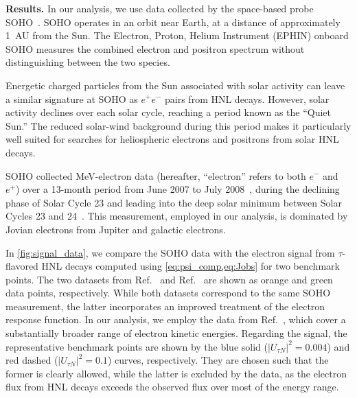 \documentclass[aps,prd,twocolumn,preprintnumbers,superscriptaddress,nofootinbib]{revtex4-1}
\begin{document}
\textbf{Results.}
\noindent
In our analysis, we use data collected by the space-based probe SOHO~\cite{SOHO1995S}. SOHO operates in an orbit near Earth, at a distance of approximately 1~AU from the Sun. The Electron, Proton, Helium Instrument (EPHIN) \cite{COSTEP} onboard SOHO measures the combined electron and positron spectrum without distinguishing between the two species.


Energetic charged particles from the Sun associated with solar activity can leave a similar signature at SOHO as $e^+e^-$ pairs from HNL decays. However, solar activity declines over each solar cycle, reaching a period known as the ``Quiet Sun.'' The reduced solar-wind background during this period makes it particularly well suited for searches for heliospheric electrons and positrons from solar HNL decays.

SOHO collected MeV-electron data (hereafter, ``electron'' refers to both $e^-$ and $e^+$) over a 13-month period from June 2007 to July 2008~\cite{Kuhl:2013icrc,Jensen2026SOHO}, during the declining phase of Solar Cycle 23 and leading into the deep solar minimum between Solar Cycles 23 and 24~\cite{NOAA:solarcycle}. This measurement, employed in our analysis, is dominated by Jovian electrons from Jupiter and galactic electrons.

In \cref{fig:signal_data}, we compare the SOHO data with the electron signal from $\tau$-flavored HNL decays computed using \cref{eq:psi_comp,eq:Jobs} for two benchmark points. The two datasets from Ref.~\cite{Kuhl:2013icrc} and Ref.~\cite{Jensen2026SOHO} are shown as orange and green data points, respectively. While both datasets correspond to the same SOHO measurement, the latter incorporates an improved treatment of the electron response function. In our analysis, we employ the data from Ref.~\cite{Kuhl:2013icrc}, which cover a substantially broader range of electron kinetic energies. Regarding the signal, the representative benchmark points are shown by the blue solid ($|U_{\tau N}|^2=0.004$) and red dashed ($|U_{\tau N}|^2=0.1$) curves, respectively. They are chosen such that the former is clearly allowed, while the latter is excluded by the data, as the electron flux from HNL decays exceeds the observed flux over most of the energy range.
\end{document}
